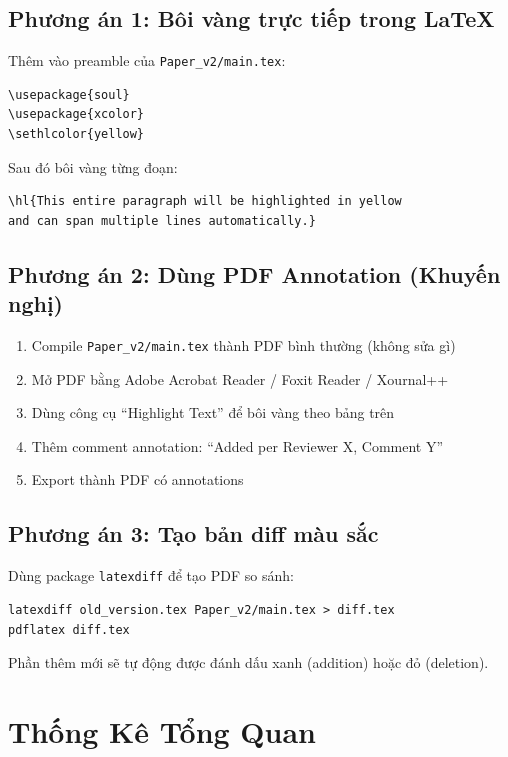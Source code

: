 \documentclass[11pt,a4paper]{article}
\begin{document}
\subsection{Phương án 1: Bôi vàng trực tiếp trong LaTeX}

Thêm vào preamble của \texttt{Paper\_v2/main.tex}:

\begin{verbatim}
\usepackage{soul}
\usepackage{xcolor}
\sethlcolor{yellow}
\end{verbatim}

Sau đó bôi vàng từng đoạn:

\begin{verbatim}
\hl{This entire paragraph will be highlighted in yellow 
and can span multiple lines automatically.}
\end{verbatim}

\subsection{Phương án 2: Dùng PDF Annotation (Khuyến nghị)}

\begin{enumerate}
    \item Compile \texttt{Paper\_v2/main.tex} thành PDF bình thường (không sửa gì)
    \item Mở PDF bằng Adobe Acrobat Reader / Foxit Reader / Xournal++
    \item Dùng công cụ ``Highlight Text'' để bôi vàng theo bảng trên
    \item Thêm comment annotation: ``Added per Reviewer X, Comment Y''
    \item Export thành PDF có annotations
\end{enumerate}

\subsection{Phương án 3: Tạo bản diff màu sắc}

Dùng package \texttt{latexdiff} để tạo PDF so sánh:

\begin{verbatim}
latexdiff old_version.tex Paper_v2/main.tex > diff.tex
pdflatex diff.tex
\end{verbatim}

Phần thêm mới sẽ tự động được đánh dấu xanh (addition) hoặc đỏ (deletion).

\section{Thống Kê Tổng Quan}
\end{document}
